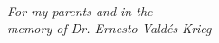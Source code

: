 
\renewcommand{\baselinestretch}{2}
\small\normalsize
\hbox{\ }
 
\vspace{-.65in}

% 
% 
\begin{center}
\textit{For my parents and in the} \\
\textit{memory of Dr. Ernesto Valdés Krieg}
\end{center} 